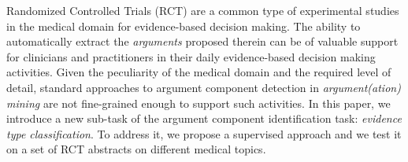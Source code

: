 Randomized Controlled Trials (RCT) are a common type of experimental studies in the medical domain for evidence-based decision making. The ability to automatically extract the \textit{arguments} proposed therein can be of valuable support for clinicians and practitioners in their daily evidence-based decision making activities. Given the peculiarity of the medical domain and the required level of detail, standard approaches to argument component detection in \textit{argument(ation) mining} are not fine-grained enough to support such activities. In this paper, we introduce a new sub-task of the argument component identification task: \textit{evidence type classification}. To address it, we propose a supervised approach and we test it on a set of RCT abstracts on different medical topics.
